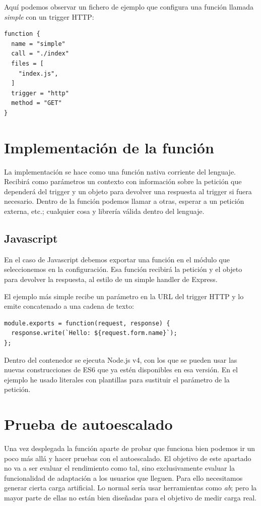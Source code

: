Aquí podemos observar un fichero de ejemplo que configura una función llamada \emph{simple} con un trigger HTTP:
\begin{verbatim}
function {
  name = "simple"
  call = "./index"
  files = [
    "index.js",
  ]
  trigger = "http"
  method = "GET"
}
\end{verbatim}

\section{Implementación de la función}

La implementación se hace como una función nativa corriente del lenguaje. Recibirá como parámetros un contexto con información sobre la petición que dependerá del trigger y un objeto para devolver una respuesta al trigger si fuera necesario. Dentro de la función podemos llamar a otras, esperar a un petición externa, etc.; cualquier cosa y librería válida dentro del lenguaje.

\subsection{Javascript}
\label{subsec:javascript}

En el caso de Javascript debemos exportar una función en el módulo que seleccionemos en la configuración. Esa función recibirá la petición y el objeto para devolver la respuesta, al estilo de un simple handler de Express\cite{expressjs}.

El ejemplo más simple recibe un parámetro en la URL del trigger HTTP y lo emite concatenado a una cadena de texto:
\begin{verbatim}
module.exports = function(request, response) {
  response.write(`Hello: ${request.form.name}`);
};
\end{verbatim}

Dentro del contenedor se ejecuta Node.js v4, con los que se pueden usar las nuevas construcciones de ES6 que ya estén disponibles en esa versión. En el ejemplo he usado literales con plantillas\cite{templateliterals} para sustituir el parámetro de la petición.

\section{Prueba de autoescalado}
\label{sec:load-test}

Una vez desplegada la función aparte de probar que funciona bien podemos ir un poco más allá y hacer pruebas con el autoescalado. El objetivo de este apartado no va a ser evaluar el rendimiento como tal, sino exclusivamente evaluar la funcionalidad de adaptación a los usuarios que lleguen. Para ello necesitamos generar cierta carga artificial. Lo normal sería usar herramientas como \emph{ab}\cite{ab}; pero la mayor parte de ellas no están bien diseñadas para el objetivo de medir carga real.

